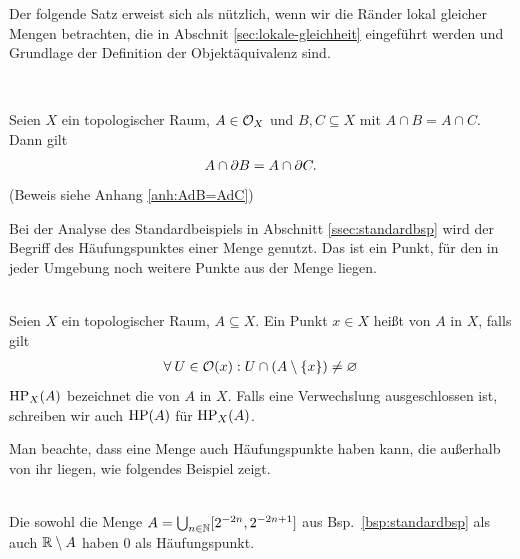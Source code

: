     Der folgende Satz erweist sich als nützlich, wenn wir die Ränder lokal gleicher Mengen betrachten, die in Abschnit \ref{sec:lokale-gleichheit} eingeführt werden und Grundlage der Definition der Objektäquivalenz sind.
    \begin{satz} \label{satz:AdB=AdC}\ \vspace{8pt}

        \noindent
        Seien $X$ ein topologischer Raum, $A \in \mathcal{O}_X$ und $B, C \subseteq X$ mit $A \cap B = A \cap C$. Dann gilt 
        \begin{align*}
            A \cap \partial B = A \cap \partial C.
        \end{align*}
        (Beweis siehe Anhang \ref{anh:AdB=AdC})
    \end{satz}
    
    
    Bei
    der Analyse des Standardbeispiels in Abschnitt \ref{ssec:standardbsp} wird der Begriff des Häufungspunktes einer Menge genutzt. 
    Das ist ein Punkt, für den in jeder Umgebung noch weitere Punkte aus der Menge liegen.
    
    \begin{dfn}[Häufungspunkt]\ \\
        Seien $X$ ein topologischer Raum, $A \subseteq X$.
        Ein Punkt $x \in X$ heißt  von $A$ in $X$, falls gilt
        \begin{align*}
            \forall\: U \in \mathcal{O}(x) : U \cap (A \setminus \{x\}) \neq \varnothing
        \end{align*}
        $\text{HP}_X(A)$ bezeichnet die  von $A$ in $X$.
        Falls eine Verwechslung ausgeschlossen ist, schreiben wir auch $\text{HP}(A)$ für $\text{HP}_X(A)$.
    \end{dfn}

        Man beachte, dass eine Menge auch Häufungspunkte haben kann, die außerhalb von ihr liegen, wie folgendes Beispiel zeigt.
    
    \begin{bsp}\ \\
        Die sowohl die Menge ${A = \bigcup_{n \in \mathbb{N}} [2^{-2n}, 2^{-2n+1}]}$ aus Bsp.~\ref{bsp:standardbsp} als auch $\mathbb{R} \setminus A$ haben $0$ als Häufungspunkt.
    \end{bsp}
    
